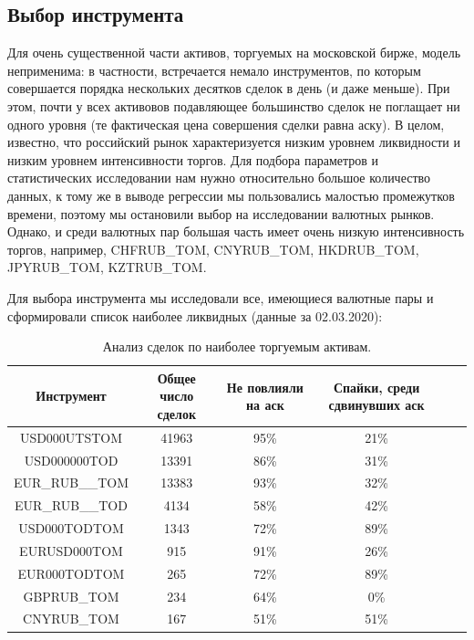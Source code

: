 \subsection{Выбор инструмента}

Для очень существенной части активов, торгуемых на московской бирже, модель неприменима: в частности,
встречается немало инструментов, по которым совершается порядка нескольких десятков сделок в день (и даже меньше). При этом, почти у всех активовов подавляющее
большинство сделок не поглащает ни одного уровня (те фактическая цена совершения сделки равна аску). В целом, известно, что российский рынок 
характеризуется низким уровнем ликвидности и низким уровнем интенсивности торгов. 
Для подбора параметров и статистических исследовании
нам нужно относительно большое количество данных, к тому же в выводе регрессии мы пользовались малостью промежутков времени, 
поэтому мы остановили выбор на исследовании валютных рынков.
Однако, и среди валютных пар большая часть имеет очень низкую интенсивность торгов, например, CHFRUB\_TOM, CNYRUB\_TOM, HKDRUB\_TOM, 
JPYRUB\_TOM, KZTRUB\_TOM. \par
Для выбора инструмента мы исследовали все, имеющиеся валютные пары и сформировали список наиболее ликвидных (данные за 02.03.2020):

\begin{table}
    \begin{center}
        \begin{tabular}{|c|c|c|c|c|c|}
            \hline
        Инструмент        & Общее число сделок & Не повлияли на аск & Спайки, среди сдвинувших аск \\ \hline
        USD000UTSTOM      & 41963 & 95\% & 21\% \\ \hline
        USD000000TOD      & 13391 & 86\% & 31\% \\ \hline
        EUR\_RUB\_\_TOM   & 13383 & 93\% & 32\% \\ \hline
        EUR\_RUB\_\_TOD   & 4134  & 58\% & 42\% \\ \hline
        USD000TODTOM      & 1343  & 72\% & 89\% \\ \hline
        EURUSD000TOM      & 915   & 91\% & 26\% \\ \hline
        EUR000TODTOM      & 265   & 72\% & 89\% \\ \hline
        GBPRUB\_TOM       & 234   & 64\% &  0\% \\ \hline
        CNYRUB\_TOM       & 167   & 51\% & 51\% \\ \hline
        \end{tabular}
    \end{center}
    \caption{Анализ сделок по наиболее торгуемым активам.}
\end{table} 

